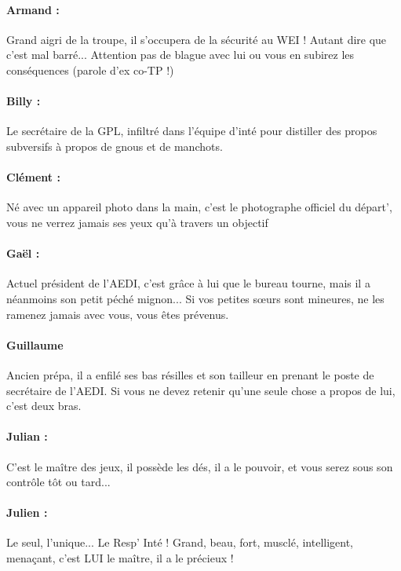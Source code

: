 \paragraph{Armand :} Grand aigri de la troupe, il s'occupera de la sécurité au WEI ! Autant dire que c'est mal barré... Attention pas de blague avec lui ou vous en subirez les conséquences (parole d'ex co-TP !)

\paragraph{Billy :} Le secrétaire de la GPL, infiltré dans l'équipe d'inté pour distiller des propos subversifs à propos de gnous et de manchots.

\paragraph{Clément :} Né avec un appareil photo dans la main, c'est le photographe officiel du départ', vous ne verrez jamais ses yeux qu'à travers un objectif
\columnbreak
~\\
\vspace{0.5cm}

\paragraph{Gaël :} Actuel président de l'AEDI, c'est grâce à lui que le bureau tourne, mais il a néanmoins son petit péché mignon... Si vos petites sœurs sont mineures, ne les ramenez jamais avec vous, vous êtes prévenus.

\paragraph{Guillaume} Ancien prépa, il a enfilé ses bas résilles et son tailleur en prenant le poste de secrétaire de l'AEDI. Si vous ne devez retenir qu'une seule chose a propos de lui, c'est deux bras.

\paragraph{Julian :} C'est le maître des jeux, il possède les dés, il a le pouvoir, et vous serez sous son contrôle tôt ou tard...
\clearpage
{}
\paragraph{Julien :}  Le seul, l'unique... Le Resp' Inté ! Grand, beau, fort, musclé, intelligent, menaçant, c'est LUI le maître, il a le précieux !
